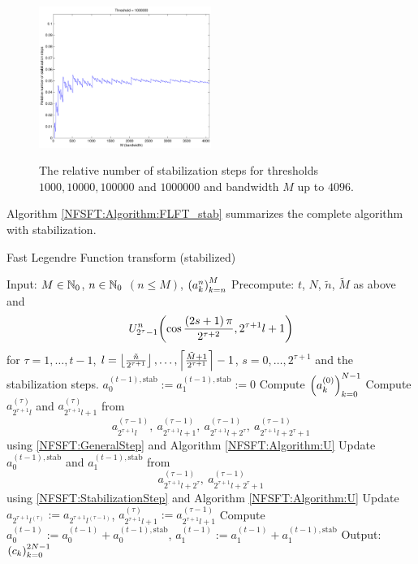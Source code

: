 \begin{figure}[htb]
   \subfigure
     {\includegraphics[width=0.5\textwidth]{images/stabilization1000000}}\\
  \caption{The relative number of stabilization steps for thresholds $1000, 10000, 100000$ and $1000000$ and bandwidth $M$ up to $4096$.}
  \label{NFSFT:figure:stabilization}
\end{figure}
Algorithm \ref{NFSFT:Algorithm:FLFT_stab} summarizes the complete algorithm with stabilization.
\begin{algorithm}[htb]
  \caption{Fast Legendre Function transform (stabilized)}
  \label{NFSFT:Algorithm:FLFT_stab}    
  \begin{algorithmic}
    \STATE Input:  $M \in \mathbb{N}_{0}$, $n \in \mathbb{N}_{0}$ $(n \le M)$, $\left(a_k^n\right)_{k=n}^{M}$
    \STATE Precompute: $t$, $N$, $\tilde{n}$, $\tilde{M}$ as above and \[U_{2^{\tau}-1}^{n}{\hspace{-0.4ex}}\left(\cos \frac{\left(2s+1\right)\pi}{2^{\tau+2}}, 2^{\tau+1}l+1\right)\] 
    \STATE {} for $\tau = 1,\ldots,t-1$, $l = \left\lfloor\frac{\tilde{n}}{2^{\tau+1}}\right\rfloor,\ldots,\left\lceil\frac{\tilde{M}+1}{2^{\tau+1}}\right\rceil-1$, 
    \STATE {} $s = 0,\ldots,2^{\tau+1}$ and the stabilization steps.
    \STATE $a_{0}^{(t-1),\text{stab}} := a_{1}^{(t-1),\text{stab}} := 0$
    \STATE Compute $\left(a_{k}^{(0)}\right)_{k=0}^{N-1}$ 
          \STATE Compute $a_{2^{\tau+1}l}^{(\tau)}$ and $a_{2^{\tau+1}l+1}^{(\tau)}$ from \[a_{2^{\tau+1}l}^{(\tau-1)},\  
            a_{2^{\tau+1}l+1}^{(\tau-1)},\ a_{2^{\tau+1}l+2^{\tau}}^{(\tau-1)},\ a_{2^{\tau+1}l+2^{\tau}+1}^{(\tau-1)}\] using 
            \eqref{NFSFT:GeneralStep} and Algorithm \ref{NFSFT:Algorithm:U}
        \ELSE
          \STATE Update $a_{0}^{(t-1),\text{stab}}$ and $a_{1}^{(t-1),\text{stab}}$ from
            \[ 
              a_{2^{\tau+1}l+2^{\tau}}^{(\tau-1)},\ a_{2^{\tau+1}l+2^{\tau}+1}^{(\tau-1)}
            \] 
            using \eqref{NFSFT:StabilizationStep} and Algorithm \ref{NFSFT:Algorithm:U}
          \STATE Update $a_{2^{\tau+1}l^{(\tau)}} := a_{2^{\tau+1}l^{(\tau-1)}}$, $a_{2^{\tau+1}l+1}^{(\tau)} := a_{2^{\tau+1}l+1}^{(\tau-1)}$
        \ENDIF
      \ENDFOR
    \ENDFOR
    \STATE Compute $a_{0}^{(t-1)} := a_{0}^{(t-1)} + a_{0}^{(t-1),\text{stab}}$, $a_{1}^{(t-1)} := a_{1}^{(t-1)} + a_{1}^{(t-1),\text{stab}}$
    \STATE Output: $\left(c_{k}\right)_{k=0}^{2N-1}$
\end{algorithmic}
\end{algorithm}

